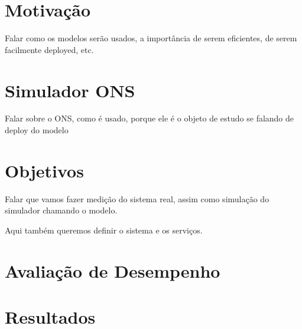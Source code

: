 \section{Motivação}%

Falar como os modelos serão usados, a importância de serem eficientes, de serem facilmente deployed, etc.

\section{Simulador ONS}%

Falar sobre o ONS, como é usado, porque ele é o objeto de estudo se falando de deploy do modelo

\section{Objetivos}%

Falar que vamos fazer medição do sistema real, assim como simulação do simulador chamando o modelo.

Aqui também queremos definir o sistema e os serviços.

\section{Avaliação de Desempenho}%

\section{Resultados}%

